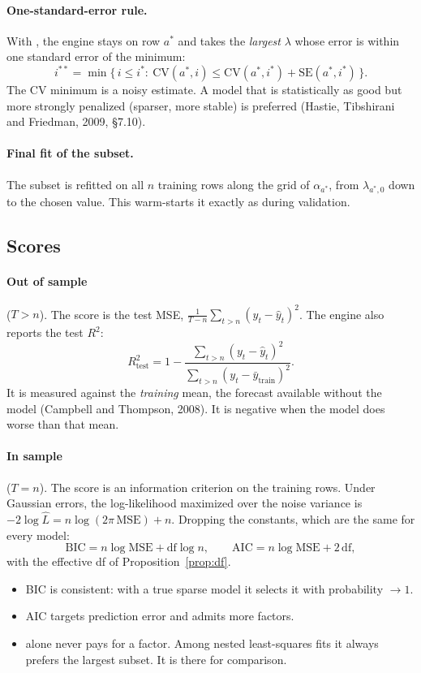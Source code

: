 \documentclass[11pt,a4paper]{article}
\begin{document}
\paragraph{One-standard-error rule.} With , the engine stays
on row $a^\ast$ and takes the \emph{largest} $\lambda$ whose error is within one standard error
of the minimum:
\[
  i^{\ast\ast}=\min\{\,i\le i^\ast:\ \mathrm{CV}(a^\ast,i)\le\mathrm{CV}(a^\ast,i^\ast)+\mathrm{SE}(a^\ast,i^\ast)\,\}.
\]
The CV minimum is a noisy estimate. A model that is statistically as good but more strongly
penalized (sparser, more stable) is preferred (Hastie, Tibshirani and Friedman, 2009, \S7.10).

\paragraph{Final fit of the subset.} The subset is refitted on all $n$ training rows along the
grid of $\alpha_{a^\ast}$, from $\lambda_{a^\ast,0}$ down to the chosen value. This warm-starts it
exactly as during validation.

\subsection{Scores}\label{sec:scores}

\paragraph{Out of sample} ($T>n$). The score is the test MSE,
$\frac1{T-n}\sum_{t>n}(y_t-\hat y_t)^2$. The engine also reports the test $R^2$:
\[
  R^2_{\text{test}}=1-\frac{\sum_{t>n}(y_t-\hat y_t)^2}{\sum_{t>n}(y_t-\bar y_{\text{train}})^2}.
\]
It is measured against the \emph{training} mean, the forecast available without the model
(Campbell and Thompson, 2008). It is negative when the model does worse than that mean.

\paragraph{In sample} ($T=n$). \label{sec:insample}
The score is an information criterion on the training rows. Under Gaussian errors, the
log-likelihood maximized over the noise variance is
$-2\log\hat L=n\log(2\pi\,\mathrm{MSE})+n$. Dropping the constants, which are the same for
every model:
\[
  \mathrm{BIC}=n\log\mathrm{MSE}+\mathrm{df}\log n,\qquad
  \mathrm{AIC}=n\log\mathrm{MSE}+2\,\mathrm{df},
\]
with the effective df of Proposition~\ref{prop:df}.
\begin{itemize}
  \item BIC is consistent: with a true sparse model it selects it with probability
        $\to1$.
  \item AIC targets prediction error and admits more factors.
  \item {} alone never pays for a factor. Among nested least-squares fits it always
        prefers the largest subset. It is there for comparison.
\end{itemize}
\end{document}

